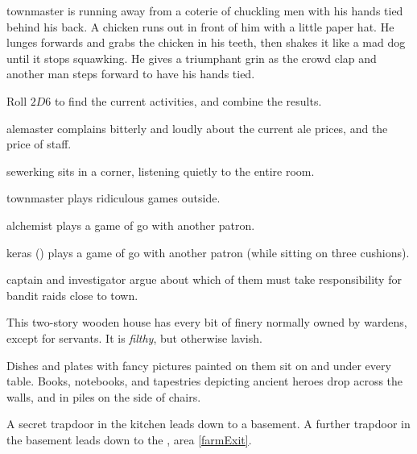 \begin{multicols}{2}
\begin{boxtext}
  \Gls{townmaster} is running away from a coterie of chuckling men with his hands tied behind his back.
   A chicken runs out in front of him with a little paper hat.
   He lunges forwards and grabs the chicken in his teeth, then shakes it like a mad dog until it stops squawking.
   He gives a triumphant grin as the crowd clap and another man steps forward to have his hands tied.
\end{boxtext}


Roll $2D6$ to find the current activities, and combine the results.

\begin{dlist}
  \item
  \Gls{alemaster} complains bitterly and loudly about the current ale prices, and the price of staff.
  \item
  \Gls{sewerking} sits in a corner, listening quietly to the entire room.
  \item
  \Gls{townmaster} plays ridiculous games outside.
  \item
  \Gls{alchemist} plays a game of go with another patron.
  \item
  \Gls{keras} () plays a game of go with another patron (while sitting on three cushions).
  \item
  \Gls{captain} and \gls{investigator} argue about which of them must take responsibility for bandit raids close to \gls{town}.
\end{dlist}


This two-story wooden house has every bit of finery normally owned by \glspl{warden}, except for servants.
It is \emph{filthy}, but otherwise lavish.

\begin{boxtext}
  Dishes and plates with fancy pictures painted on them sit on and under every table.
  Books, notebooks, and tapestries depicting ancient heroes drop across the walls, and in piles on the side of chairs.
\end{boxtext}

A secret trapdoor in the kitchen leads down to a basement.
A further trapdoor in the basement leads down to the , area \vref{farmExit}.


\end{multicols}

